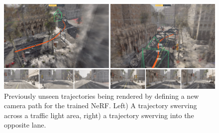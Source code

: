 \begin{figure}[h]
    \centering
    \includegraphics[width=1.0\textwidth]{figures/unseen-trajectories-v2.png}
    \caption{Previously unseen trajectories being rendered by defining a new camera path for the trained NeRF. Left) A trajectory swerving across a traffic light area, right) a trajectory swerving into the opposite lane.}
    \label{fig:unseen-trajectories-v2}
\end{figure}
